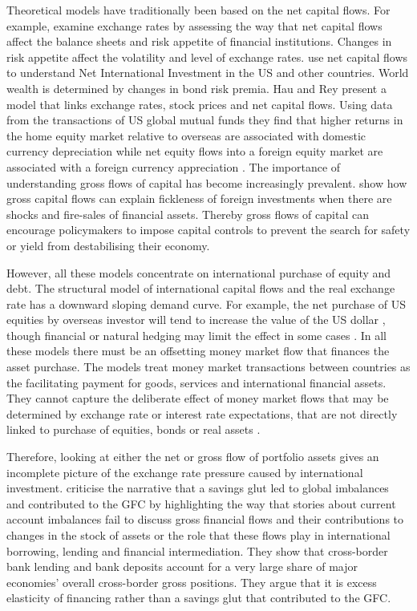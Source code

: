 \documentclass[jrfm,article,accept,moreauthors,pdftex]{Definitions/mdpi}
\begin{document}
Theoretical models have traditionally been based on the net capital flows.  For example, \citep{Gabaix15} examine exchange rates by assessing the way that net capital flows affect the balance sheets and risk appetite of financial institutions.  Changes in risk appetite affect the volatility and level of exchange rates. \citep{Devereux2020} use net capital flows to understand Net International Investment in the US and other countries.  World wealth is determined by changes in bond risk premia. Hau and Rey present a model that links exchange rates, stock prices and net capital flows.  Using data from the transactions of US global mutual funds they find that higher returns in the home equity market relative to overseas are associated with domestic currency depreciation while net equity flows into a foreign equity market are associated with a foreign currency appreciation \citep{HauEquity}.  The importance of understanding gross flows of capital has become increasingly prevalent.  \citep{CaballeroCapital} show how gross capital flows can explain {fickleness} of foreign investments when there are shocks and fire-sales of financial assets.  Thereby gross flows of capital can encourage policymakers to impose capital controls to prevent the search for safety or yield from destabilising their economy.   

However, all these models concentrate on international purchase of equity and debt.  The structural model of international capital flows and the real exchange rate has a downward sloping demand curve. For example, the net purchase of US equities by overseas investor will tend to increase the value of the US dollar \citep{HauEquity}, though financial or natural hedging may limit the effect in some cases \citep{BathiaBourasDemirerGupta}.     In all these models there must be an offsetting money market flow that finances the asset purchase.  The models treat money market transactions between countries as the facilitating payment for goods, services and international financial assets.  They cannot capture the deliberate effect of money market flows that may be determined by exchange rate or interest rate expectations, that are not directly linked to purchase of equities, bonds or real assets \mbox{\citep{BISCapitalFlow}}. 

Therefore, looking at either the net or gross flow of portfolio assets gives an incomplete picture of the exchange rate pressure caused by international investment.  \citep{BISIMbalance} criticise the narrative that a {savings glut} led to global imbalances and contributed to the GFC by highlighting the way that stories about current account imbalances fail to discuss gross financial flows and their contributions to changes in the stock of assets or the role that these flows play in international borrowing, lending and financial intermediation.   They show that cross-border bank lending and bank deposits account for a very large share of major economies' overall cross-border gross positions. They argue that it is {excess} elasticity of financing rather than a {savings glut} that contributed to the GFC.  
\end{document}
